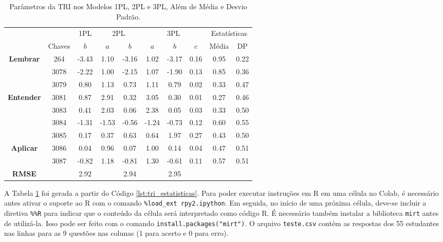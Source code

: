 \begin{table}[!ht]
    \centering
\caption{Parâmetros da TRI nos Modelos 1PL, 2PL e 3PL, Além de Média e Desvio Padrão.}
    \label{tab:parameters}\normalsize
    \begin{tabular}{cccccccccc}
    \toprule
    & & \multicolumn{1}{c}{1PL} & \multicolumn{2}{c}{2PL} & \multicolumn{3}{c}{3PL} & \multicolumn{2}{c}{Estatísticas} \\
    \cmidrule(r){3-3} \cmidrule(r){4-5} \cmidrule(r){6-8} \cmidrule(r){9-10}
    & Chaves & $b$ & $a$ & $b$ & $a$ & $b$ & $c$ & Média & DP \\
    \midrule
    \cellcolor{green!25}\textbf{Lembrar} & 264 & -3.43 & 1.10 & -3.16 & 1.02 & -3.17 & 0.16 & 0.95 & 0.22 \\
    \cellcolor{green!25}
    & 3078 & -2.22 & 1.00 & -2.15 & 1.07 & -1.90 & 0.13 & 0.85 & 0.36 \\
    \cellcolor{green!25}
    & 3079 & 0.80 & 1.13 & 0.73 & 1.11 & 0.79 & 0.02 & 0.33 & 0.47 \\
    \midrule
    \cellcolor{yellow!25}\textbf{Entender} & 3081 & 0.87 & 2.91 & 0.32 & 3.05 & 0.30 & 0.01 & 0.27 & 0.46 \\
    \cellcolor{yellow!25}
    & 3083 & 0.41 & 2.03 & 0.06 & 2.38 & 0.05 & 0.03 & 0.33 & 0.50 \\
    \cellcolor{yellow!25}
    & 3084 & -1.31 & -1.53 & -0.56 & -1.24 & -0.73 & 0.12 & 0.60 & 0.55 \\
    \cellcolor{yellow!25}
    & 3085 & 0.17 & 0.37 & 0.63 & 0.64 & 1.97 & 0.27 & 0.43 & 0.50 \\
    \midrule
    \cellcolor{red!25}
    \textbf{Aplicar} & 3086 & 0.04 & 0.96 & 0.07 & 1.00 & 0.14 & 0.04 & 0.47 & 0.51 \\
    \cellcolor{red!25}
    & 3087 & -0.82 & 1.18 & -0.81 & 1.30 & -0.61 & 0.11 & 0.57 & 0.51 \\
    \bottomrule
    \textbf{RMSE} & & 2.92 & & 2.94 & & 2.95 & & & \\
    \bottomrule
    \end{tabular}\normalsize
\end{table}


A Tabela \ref{tab:parameters} foi gerada a partir do Código \ref{lst:tri_estatisticas}. Para poder executar instruções em R em uma célula no Colab, é necessário antes ativar o suporte ao R com o comando \verb|%load_ext rpy2.ipython|. Em seguida, no início de uma próxima célula, deve-se incluir a diretiva \verb|%%R| para indicar que o conteúdo da célula será interpretado como código R. É necessário também instalar a biblioteca \verb|mirt| antes de utilizá-la. Isso pode ser feito com o comando \verb|install.packages("mirt")|. O arquivo \verb|teste.csv| contém as respostas dos 55 estudantes nas linhas para as 9 questões nas colunas (1 para acerto e 0 para erro).

